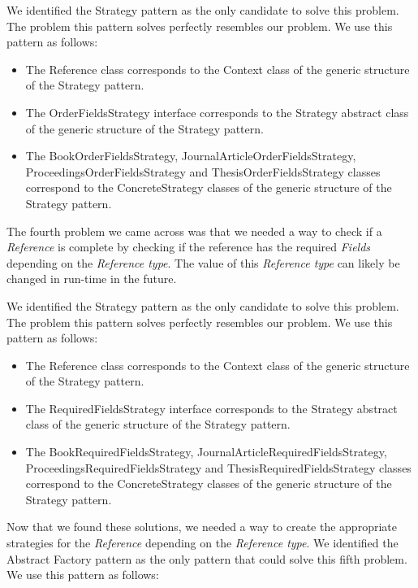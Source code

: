 \documentclass[a4paper]{article}
\begin{document}
We identified the Strategy pattern as the only candidate to solve this problem. The problem this pattern solves perfectly resembles our problem. We use this pattern as follows:

\begin{itemize}
	\item The Reference class corresponds to the Context class of the generic structure of the Strategy pattern.
	\item The OrderFieldsStrategy interface corresponds to the Strategy abstract class of the generic structure of the Strategy pattern.
	\item The BookOrderFieldsStrategy, JournalArticleOrderFieldsStrategy, ProceedingsOrderFieldsStrategy and ThesisOrderFieldsStrategy classes correspond to the ConcreteStrategy classes of the generic structure of the Strategy pattern.
\end{itemize}

The fourth problem we came across was that we needed a way to check if a \textit{Reference} is complete by checking if the reference has the required \textit{Fields} depending on the \textit{Reference type}. The value of this \textit{Reference type} can likely be changed in run-time in the future.

We identified the Strategy pattern as the only candidate to solve this problem. The problem this pattern solves perfectly resembles our problem. We use this pattern as follows:

\begin{itemize}
	\item The Reference class corresponds to the Context class of the generic structure of the Strategy pattern.
	\item The RequiredFieldsStrategy interface corresponds to the Strategy abstract class of the generic structure of the Strategy pattern.
	\item The BookRequiredFieldsStrategy, JournalArticleRequiredFieldsStrategy, ProceedingsRequiredFieldsStrategy and ThesisRequiredFieldsStrategy classes correspond to the ConcreteStrategy classes of the generic structure of the Strategy pattern.
\end{itemize}

Now that we found these solutions, we needed a way to create the appropriate strategies for the \textit{Reference} depending on the \textit{Reference type}. We identified the Abstract Factory pattern as the only pattern that could solve this fifth problem. We use this pattern as follows:
\end{document}
